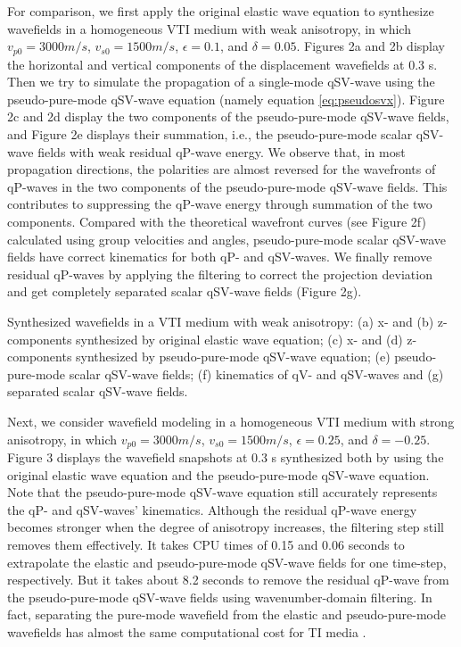 For comparison, we first apply the original elastic wave equation
to synthesize wavefields in a homogeneous VTI medium with weak anisotropy, in which
$v_{p0}=3000 m/s$, $v_{s0}=1500 m/s$, $\epsilon=0.1$, and $\delta=0.05$. 
Figures 2a and 2b display the horizontal and vertical components of the displacement
wavefields at 0.3 s.
Then we try to simulate the propagation of a single-mode qSV-wave using the pseudo-pure-mode qSV-wave equation
(namely equation \ref{eq:pseudosvx}).
 Figure 2c and 2d display the two components of the pseudo-pure-mode qSV-wave fields,
 and Figure 2e displays their summation, i.e., the pseudo-pure-mode scalar qSV-wave
 fields with weak residual qP-wave energy.
We observe that, in most propagation directions, the polarities are almost reversed for the wavefronts of qP-waves
in the two components of the pseudo-pure-mode qSV-wave fields.
This contributes to suppressing the qP-wave energy through summation of the two components. 
Compared with the theoretical wavefront curves (see Figure 2f) calculated
using group velocities
 and angles, pseudo-pure-mode scalar qSV-wave fields have correct kinematics for
  both qP- and qSV-waves.
 We finally remove residual qP-waves by applying the filtering to correct the projection deviation
 and get completely separated scalar qSV-wave fields (Figure 2g).

{
Synthesized wavefields in a VTI medium with weak anisotropy: (a) x- and
(b) z-components synthesized by original elastic wave equation; (c) x- and
(d) z-components synthesized by pseudo-pure-mode qSV-wave equation; (e) pseudo-pure-mode scalar qSV-wave fields; 
(f) kinematics of qV- and qSV-waves and (g) separated scalar qSV-wave fields.
}


Next, we consider wavefield modeling in a homogeneous VTI medium with strong
anisotropy,
in which $v_{p0}=3000 m/s$, $v_{s0}=1500 m/s$, $\epsilon=0.25$, and $\delta=-0.25$.
Figure 3 displays the wavefield snapshots at 0.3 s synthesized both by using the original
elastic wave equation
and the pseudo-pure-mode qSV-wave equation. Note that the pseudo-pure-mode
  qSV-wave equation still accurately
  represents the qP- and qSV-waves' kinematics. Although the residual qP-wave energy
  becomes stronger when
  the degree of anisotropy increases, the filtering step still removes them effectively.
It takes CPU times of 0.15 and 0.06 seconds to extrapolate the elastic and pseudo-pure-mode qSV-wave fields for one time-step, respectively.
But it takes about 8.2 seconds to remove the residual qP-wave from the pseudo-pure-mode qSV-wave fields using wavenumber-domain filtering.
In fact, separating the pure-mode wavefield from the elastic and pseudo-pure-mode wavefields has almost the same computational cost for TI media \cite[]{cheng.kang:2014}.

